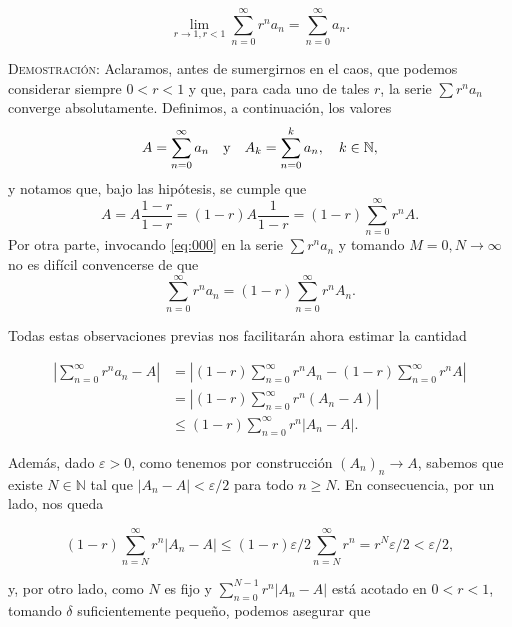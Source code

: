 \documentclass{article}
\begin{document}
\begin{itemize}
    \[\lim_{r \to 1, r < 1} \sum_{n=0}^{\infty} r^na_n = \sum_{n=0}^{\infty} a_n.\]

    \vspace{7px}

    \textsc{Demostración}: Aclaramos, antes de sumergirnos en el caos, que podemos considerar siempre $0 < r < 1$ y que, para cada uno de tales $r$, la serie $\sum r^na_n$ converge absolutamente. Definimos, a continuación, los valores \[A = \sum_{n=0}^{\infty} a_n \hspace{10px} \text{y} \hspace{10px} A_k = \sum_{n=0}^{k} a_n, \hspace{10px} k \in \mathbb{N},\] y notamos que, bajo las hipótesis, se cumple que \[A = A\frac{1 - r}{1 - r} = (1 - r)A\frac{1}{1-r} = (1 - r)\sum_{n=0}^{\infty}r^nA.\]
    Por otra parte, invocando \eqref{eq:000} en la serie $\sum r^na_n$ y tomando $M = 0, N \to \infty$ no es difícil convencerse de que \[\sum_{n=0}^{\infty} r^na_n = (1 - r)\sum_{n=0}^{\infty} r^nA_n.\]

    Todas estas observaciones previas nos facilitarán ahora estimar la cantidad

    \begin{equation*}
        \begin{split}
            \left|\sum_{n=0}^{\infty} r^na_n - A\right| &= \left|(1 - r)\sum_{n=0}^{\infty} r^nA_n - (1 - r)\sum_{n=0}^{\infty} r^nA\right| \\
            &= \left|(1 - r)\sum_{n=0}^{\infty} r^n(A_n - A)\right| \\
            &\leq (1 - r)\sum_{n=0}^{\infty} r^n|A_n - A|.
        \end{split}
    \end{equation*}

    Además, dado $\varepsilon > 0$, como tenemos por construcción $(A_n)_n \to A$, sabemos que existe $N \in \mathbb{N}$ tal que $|A_n - A| < \varepsilon/2$ para todo $n \geq N$. En consecuencia, por un lado, nos queda 

    \begin{equation}
        (1 - r)\sum_{n=N}^{\infty} r^n|A_n - A| \leq (1 - r)\varepsilon/2\sum_{n=N}^{\infty} r^n = r^N\varepsilon/2 < \varepsilon/2,
        \label{eq:001}
    \end{equation}

    y, por otro lado, como $N$ es fijo y $\sum_{n=0}^{N-1} r^n|A_n - A|$ está acotado en $0 < r < 1$, tomando $\delta$ suficientemente pequeño, podemos asegurar que 


\end{itemize}
\end{document}
